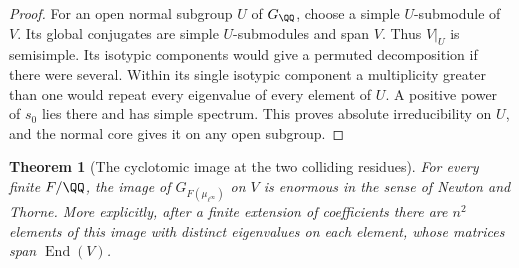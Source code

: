 \documentclass[a4paper,11pt]{article}
\newtheorem{theorem}[proposition]{Theorem}
\theoremstyle{definition}
\theoremstyle{remark}
\numberwithin{equation}{section}
\begin{document}
\begin{proof}
For an open normal subgroup \(U\) of \(G_\QQ\), choose a simple
\(U\)-submodule of \(V\). Its global conjugates are simple
\(U\)-submodules and span \(V\). Thus \(V|_U\) is semisimple.
Its isotypic components would give a permuted decomposition if
there were several. Within its single isotypic component a
multiplicity greater than one would repeat every eigenvalue of
every element of \(U\). A positive power of \(s_0\) lies there
and has simple spectrum. This proves absolute irreducibility on
\(U\), and the normal core gives it on any open subgroup.
\end{proof}

\begin{theorem}[The cyclotomic image at the two colliding residues]
\leavevmode\label{thm:enormousall559}
For every finite \(F/\QQ\), the image of
\(G_{F(\mu_{\ell^\infty})}\) on \(V\) is enormous in the sense
of Newton and Thorne. More explicitly, after a finite extension
of coefficients there are \(n^2\) elements of this image with
distinct eigenvalues on each element, whose matrices span
\(\operatorname{End}(V)\).
\end{theorem}
\end{document}

